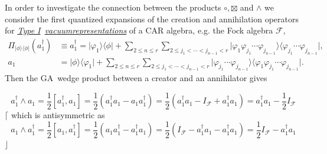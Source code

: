 \documentclass[aps, preprint]{revtex4}
\begin{document}
In order to investigate the connection between the products $ \circ  , \boxtimes $ and $ \wedge $ we consider the first quantized expansions of the creation and annihilation operators for \underline {\emph{Type I}}\emph{\ }\underline {\emph{vacuum}\emph{representations}} of a CAR algebra, e.g. the Fock algebra $\mathcal{F}\text{,}$
\begin{align}\Pi _{\vert \phi  \rangle  \langle \phi \vert } \left (a_{1}^{ \dag }\right ) &  \equiv a_{1}^{ \dag } =\vert \varphi _{1} \rangle  \langle \phi \vert  +\sum _{2 \leq n \leq r}\sum _{2 \leq j_{1} <\cdots  <j_{n -1} <r}\vert \varphi _{1} \varphi _{j_{1}} \cdots  \varphi _{j_{n -1}} \rangle  \langle \varphi _{j_{1}} \cdots  \varphi _{j_{n -1}}\vert \text{,} \\
a_{1} &  =\vert \phi  \rangle  \langle \varphi _{1}\vert  +\sum _{2 \leq n \leq r}\sum _{2 \leq j_{1} <\cdots  <j_{n -1} <r}\vert \varphi _{j_{1}} \cdots  \varphi _{j_{n -1}} \rangle  \langle \varphi _{1} \varphi _{j_{1}} \cdots  \varphi _{j_{n -1}}\vert \text{.}\end{align}Then the GA\ wedge product between a creator and an annihilator gives 

\begin{equation}a_{1}^{ \dag } \wedge a_{1} =\frac{1}{2} \left [a_{1}^{ \dag } ,a_{1}\right ] =\frac{1}{2} \left (a_{1}^{ \dag } a_{1} -a_{1} a_{1}^{ \dag }\right ) =\frac{1}{2} \left (a_{1}^{ \dag } a_{1} -I_{\mathcal{F}} +a_{1}^{ \dag } a_{1}\right ) =a_{1}^{ \dag } a_{1} -\frac{1}{2} I_{\mathcal{F}}
\end{equation}$\lceil $ which is antisymmetric as
\begin{equation}a_{1} \wedge a_{1}^{ \dag } =\frac{1}{2} \left [a_{1} ,a_{1}^{ \dag }\right ] =\frac{1}{2} \left (a_{1} a_{1}^{ \dag } -a_{1}^{ \dag } a_{1}\right ) =\frac{1}{2} \left (I_{\mathcal{F}} -a_{1}^{ \dag } a_{1} -a_{1}^{ \dag } a_{1}\right ) =\frac{1}{2} I_{\mathcal{F}} -a_{1}^{ \dag } a_{1}
\end{equation}$\rfloor $ 
\end{document}
